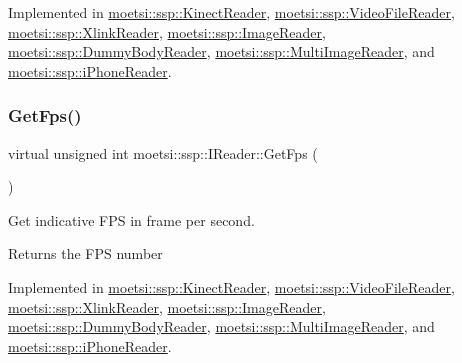 Implemented in \hyperlink{classmoetsi_1_1ssp_1_1KinectReader_aa17e268723c41bdad5082575decb28eb}{moetsi\+::ssp\+::\+Kinect\+Reader}, \hyperlink{classmoetsi_1_1ssp_1_1VideoFileReader_aef5c92da2645cddc7e4ffcfd34ad4b8a}{moetsi\+::ssp\+::\+Video\+File\+Reader}, \hyperlink{classmoetsi_1_1ssp_1_1XlinkReader_ae11a3b07f2f036f87bc3d96685f61dae}{moetsi\+::ssp\+::\+Xlink\+Reader}, \hyperlink{classmoetsi_1_1ssp_1_1ImageReader_a386125736df9f25e5c4312bb679ff031}{moetsi\+::ssp\+::\+Image\+Reader}, \hyperlink{classmoetsi_1_1ssp_1_1DummyBodyReader_a91d5b81c241103ffde276d354a34d7db}{moetsi\+::ssp\+::\+Dummy\+Body\+Reader}, \hyperlink{classmoetsi_1_1ssp_1_1MultiImageReader_a994eea20e9682c2f4afc9303a34c76f3}{moetsi\+::ssp\+::\+Multi\+Image\+Reader}, and \hyperlink{classmoetsi_1_1ssp_1_1iPhoneReader_a78792c6319743aed3ef2afc96fe16485}{moetsi\+::ssp\+::i\+Phone\+Reader}.

\mbox{\label{classmoetsi_1_1ssp_1_1IReader_a9f6a8650ca290b011b8e5451eeae9f32}} 
\subsubsection{\texorpdfstring{Get\+Fps()}{GetFps()}\hspace{0.1cm}{\footnotesize\ttfamily [1/2]}}
{\footnotesize\ttfamily virtual unsigned int moetsi\+::ssp\+::\+I\+Reader\+::\+Get\+Fps (\begin{DoxyParamCaption}{ }\end{DoxyParamCaption})\hspace{0.3cm}{\ttfamily [pure virtual]}}



Get indicative F\+PS in frame per second. 

\begin{DoxyReturn}{Returns}
the F\+PS number 
\end{DoxyReturn}


Implemented in \hyperlink{classmoetsi_1_1ssp_1_1KinectReader_ac88c13693ce8e2e249438ac8de8a7b3c}{moetsi\+::ssp\+::\+Kinect\+Reader}, \hyperlink{classmoetsi_1_1ssp_1_1VideoFileReader_a83359ad82898acdb75240568b182247c}{moetsi\+::ssp\+::\+Video\+File\+Reader}, \hyperlink{classmoetsi_1_1ssp_1_1XlinkReader_accfec6799b561107f27240e5324aa5d4}{moetsi\+::ssp\+::\+Xlink\+Reader}, \hyperlink{classmoetsi_1_1ssp_1_1ImageReader_a86adfec8106c366aaf1ec63e2a7da156}{moetsi\+::ssp\+::\+Image\+Reader}, \hyperlink{classmoetsi_1_1ssp_1_1DummyBodyReader_a7dab48cb8ec247add0c57d98e6cd5fb4}{moetsi\+::ssp\+::\+Dummy\+Body\+Reader}, \hyperlink{classmoetsi_1_1ssp_1_1MultiImageReader_ad0a249af66f8e1a063c3e575fc1b94cb}{moetsi\+::ssp\+::\+Multi\+Image\+Reader}, and \hyperlink{classmoetsi_1_1ssp_1_1iPhoneReader_a4bb216847a6c2ed8eb5d31788a0b8477}{moetsi\+::ssp\+::i\+Phone\+Reader}.

